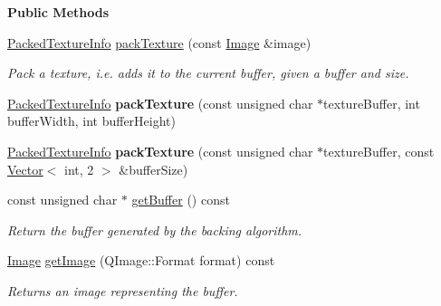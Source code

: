 \begin{Indent}\textbf{ Public Methods}\par
\begin{DoxyCompactItemize}
\item 
\mbox{\hyperlink{structrev_1_1_packed_texture_info}{Packed\+Texture\+Info}} \mbox{\hyperlink{classrev_1_1_texture_packer_a713b0e95dafb6e9086cd02a7594b9e59}{pack\+Texture}} (const \mbox{\hyperlink{classrev_1_1_image}{Image}} \&image)
\begin{DoxyCompactList}\small\item\em Pack a texture, i.\+e. adds it to the current buffer, given a buffer and size. \end{DoxyCompactList}\item 
\mbox{\label{classrev_1_1_texture_packer_a0af77c2fd8de660f5e86a231df8cacf3}} 
\mbox{\hyperlink{structrev_1_1_packed_texture_info}{Packed\+Texture\+Info}} {\bfseries pack\+Texture} (const unsigned char $\ast$texture\+Buffer, int buffer\+Width, int buffer\+Height)
\item 
\mbox{\label{classrev_1_1_texture_packer_a638d4749859bd095e7b2f51546a13b28}} 
\mbox{\hyperlink{structrev_1_1_packed_texture_info}{Packed\+Texture\+Info}} {\bfseries pack\+Texture} (const unsigned char $\ast$texture\+Buffer, const \mbox{\hyperlink{classrev_1_1_vector}{Vector}}$<$ int, 2 $>$ \&buffer\+Size)
\item 
\mbox{\label{classrev_1_1_texture_packer_ae3ed12057d5af009e54a573ad7160ea7}} 
const unsigned char $\ast$ \mbox{\hyperlink{classrev_1_1_texture_packer_ae3ed12057d5af009e54a573ad7160ea7}{get\+Buffer}} () const
\begin{DoxyCompactList}\small\item\em Return the buffer generated by the backing algorithm. \end{DoxyCompactList}\item 
\mbox{\hyperlink{classrev_1_1_image}{Image}} \mbox{\hyperlink{classrev_1_1_texture_packer_a8d34c1b28c46adf169fce7edcc52aad9}{get\+Image}} (Q\+Image\+::\+Format format) const
\begin{DoxyCompactList}\small\item\em Returns an image representing the buffer. \end{DoxyCompactList}\item 
\mbox{\label{classrev_1_1_texture_packer_a60d1850fc526cc4bde8c1798aaa9b674}} 

\end{DoxyCompactItemize}
\end{Indent}
